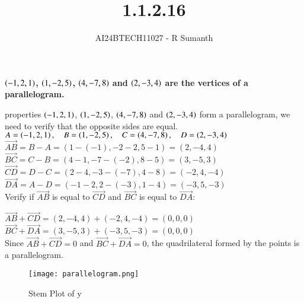 \documentclass[journal]{IEEEtran}
\begin{document}

\vspace{3cm}

\title{1.1.2.16}
\author{AI24BTECH11027 - R Sumanth}
{\let\newpage\relax\maketitle}

\renewcommand{\thefigure}{\theenumi}
\renewcommand{\thetable}{\theenumi}
\setlength{\intextsep}{10pt} %
\begin{enumerate}


\textbf { $\left(-1,2,1\right)$, $\left(1,-2,5\right)$, $\left(4,-7,8\right)$ and $\left(2,-3,4\right)$ are the vertices of a parallelogram. }

\solution

properties  $\left(-1, 2, 1\right)$, $\left(1, -2, 5\right)$, $\left(4, -7, 8\right)$ and $\left(2, -3, 4\right)$ form a parallelogram, we need to verify that the opposite sides are equal.\\

$A = \left(-1, 2, 1\right), \quad B = \left(1, -2, 5\right), \quad C = \left(4, -7, 8\right), \quad D = \left(2, -3, 4\right)$ \\


$\overrightarrow{AB} = B - A = (1 - (-1), -2 - 2, 5 - 1) = (2, -4, 4)$ \\

$\overrightarrow{BC} = C - B = (4 - 1, -7 - (-2), 8 - 5) = (3, -5, 3)$ \\

$\overrightarrow{CD} = D - C = (2 - 4, -3 - (-7), 4 - 8) = (-2, 4, -4)$ \\

$\overrightarrow{DA} = A - D = (-1 - 2, 2 - (-3), 1 - 4) = (-3, 5, -3)$ \\

Verify if $\overrightarrow{AB}$ is equal to $ \overrightarrow{CD} $ and $ \overrightarrow{BC} $ is equal to $ \overrightarrow{DA} $:

$\overrightarrow{AB} + \overrightarrow{CD} = (2, -4, 4) + (-2, 4, -4) = (0, 0, 0)$ \\

$\overrightarrow{BC} + \overrightarrow{DA} = (3, -5, 3) + (-3, 5, -3) = (0, 0, 0)$ \\

Since $\overrightarrow{AB} + \overrightarrow{CD} = 0 $ and $ \overrightarrow{BC} + \overrightarrow{DA} = 0 $, the quadrilateral formed by the points is a parallelogram.

\begin{figure}[h!]
   \centering
	\texttt{[image: parallelogram.png]}
   \caption{Stem Plot of y}
   \label{stemplot}
\end{figure}


\renewcommand{\thetable}{\theenumi}

\end{enumerate}
\end{document}
